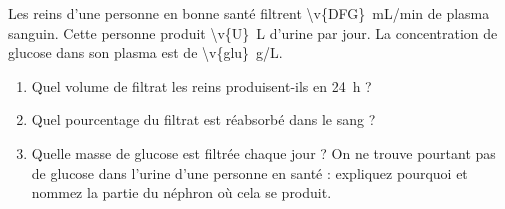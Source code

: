 Les reins d'une personne en bonne santé filtrent \qty{\v{DFG}}{mL/min} de plasma sanguin. Cette personne produit \qty{\v{U}}{L} d'urine par jour. La concentration de glucose dans son plasma est de \qty{\v{glu}}{g/L}.

\begin{enumerate}[label=\alph*)]
    \item Quel volume de filtrat les reins produisent-ils en \qty{24}{h} ?
    \item Quel pourcentage du filtrat est réabsorbé dans le sang ?
    \item Quelle masse de glucose est filtrée chaque jour ? On ne trouve pourtant pas de glucose dans l'urine d'une personne en santé : expliquez pourquoi et nommez la partie du néphron où cela se produit.
\end{enumerate}
